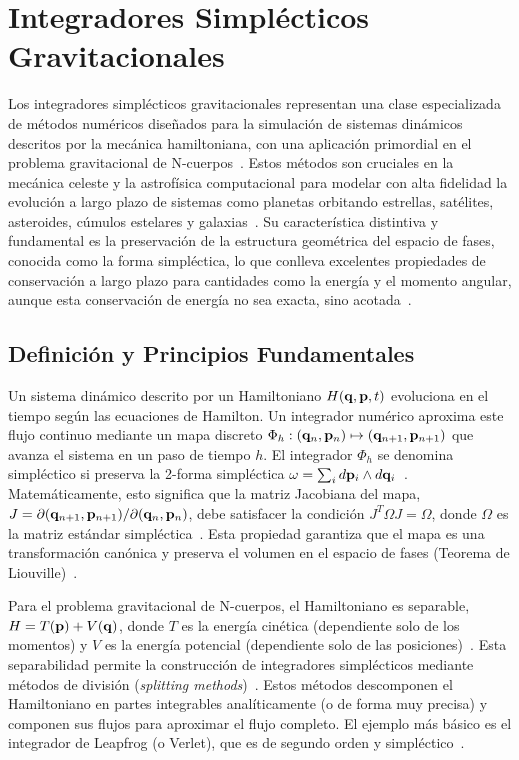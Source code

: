 \section[Integradores Simplécticos]{Integradores Simplécticos Gravitacionales}%
\label{sec:IntegradoresSimplecticos}

Los integradores simplécticos gravitacionales representan una clase especializada de métodos numéricos diseñados para la simulación de sistemas dinámicos descritos por la mecánica hamiltoniana, con una aplicación primordial en el problema gravitacional de N-cuerpos~\cite{wisdom1991, stuchi2002}. Estos métodos son cruciales en la mecánica celeste y la astrofísica computacional para modelar con alta fidelidad la evolución a largo plazo de sistemas como planetas orbitando estrellas, satélites, asteroides, cúmulos estelares y galaxias~\cite{wisdom1991, chin2005, hernandez2020}. Su característica distintiva y fundamental es la preservación de la estructura geométrica del espacio de fases, conocida como la forma simpléctica, lo que conlleva excelentes propiedades de conservación a largo plazo para cantidades como la energía y el momento angular, aunque esta conservación de energía no sea exacta, sino acotada~\cite{stuchi2002, farr2007, yoshida1993}.

\subsection{Definición y Principios Fundamentales}
Un sistema dinámico descrito por un Hamiltoniano \( H(\mathbf{q}, \mathbf{p}, t) \) evoluciona en el tiempo según las ecuaciones de Hamilton. Un integrador numérico aproxima este flujo continuo mediante un mapa discreto \(\Phi_h: (\mathbf{q}_n, \mathbf{p}_n) \mapsto (\mathbf{q}_{n+1}, \mathbf{p}_{n+1})\) que avanza el sistema en un paso de tiempo \(h\). El integrador \(\Phi_h\) se denomina simpléctico si preserva la 2-forma simpléctica \(\omega = \sum_i d\mathbf{p}_i \wedge d\mathbf{q}_i\)~\cite{stuchi2002, farr2007}. Matemáticamente, esto significa que la matriz Jacobiana del mapa, \( J = \partial(\mathbf{q}_{n+1}, \mathbf{p}_{n+1}) / \partial(\mathbf{q}_n, \mathbf{p}_n) \), debe satisfacer la condición \( J^T \Omega J = \Omega \), donde \(\Omega\) es la matriz estándar simpléctica~\cite{farr2007, yoshida1993}. Esta propiedad garantiza que el mapa es una transformación canónica y preserva el volumen en el espacio de fases (Teorema de Liouville)~\cite{wisdom1991, stuchi2002}.

Para el problema gravitacional de N-cuerpos, el Hamiltoniano es separable, \( H = T(\mathbf{p}) + V(\mathbf{q}) \), donde \( T \) es la energía cinética (dependiente solo de los momentos) y \( V \) es la energía potencial (dependiente solo de las posiciones)~\cite{chin2005, Hernandez2015}. Esta separabilidad permite la construcción de integradores simplécticos mediante métodos de división (\textit{splitting methods})~\cite{stuchi2002, chin2005}. Estos métodos descomponen el Hamiltoniano en partes integrables analíticamente (o de forma muy precisa) y componen sus flujos para aproximar el flujo completo. El ejemplo más básico es el integrador de Leapfrog (o Verlet), que es de segundo orden y simpléctico~\cite{stuchi2002, farr2007, Hernandez2015}.


